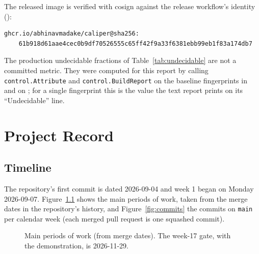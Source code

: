 The released image is verified with cosign against the release workflow's identity ():

\begin{Verbatim}[fontsize=\footnotesize,frame=single,framesep=2mm]
ghcr.io/abhinavmadake/caliper@sha256:
    61b918d61aae4cec0b9df70526555c65ff42f9a33f6381ebb99eb1f83a174db7
\end{Verbatim}

The production undecidable fractions of Table~\ref{tab:undecidable} are not a committed metric. They were computed for this report by calling \texttt{control.Attribute} and \texttt{control.BuildReport} on the baseline fingerprints in  and on ; for a single fingerprint this is the value the text report prints on its ``Undecidable'' line.

\chapter{Project Record}
\label{app:record}

\section{Timeline}

The repository's first commit is dated 2026-09-04 and week 1 began on Monday 2026-09-07. Figure~\ref{fig:gantt} shows the main periods of work, taken from the merge dates in the repository's history, and Figure~\ref{fig:commits} the commits on \texttt{main} per calendar week (each merged pull request is one squashed commit).

\begin{figure}[H]
\centering
{}
\caption{Main periods of work (from merge dates). The week-17 gate, with the demonstration, is 2026-11-29.}
\label{fig:gantt}
\end{figure}


